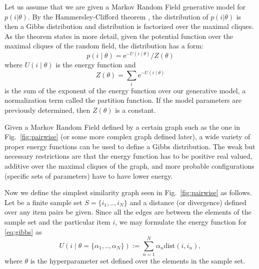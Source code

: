 Let us assume that we are given a Markov Random Field generative model for $p (i|\theta)$.
By the Hammersley-Clifford theorem \cite{hammersley1971markov}, the distribution of $p (i|\theta)$ is then a Gibbs distribution and distribution is factorized over the maximal cliques.
As the theorem states in more detail, given the potential function over the maximal cliques of the random field, the distribution has a form:
%
\begin{equation}
    p(i \mid \theta) = {\mathrm{e}^{-U(i\mid \theta)}}/{Z(\theta)}
    \label{eq:gibbs}
\end{equation}
%
where $U(i\mid \theta)$ is the energy function and 
%
\begin{equation}
Z(\theta) = \sum_{i} \mathrm{e}^{-U(i \mid \theta)}
\nonumber
\end{equation}
%
is the sum of the exponent of the energy function over our generative model, a normalization term called the partition function. If the model parameters are previously determined, then $Z(\theta)$ is a constant. 

Given a Markov Random Field defined by a certain graph such as the one in Fig.~\ref{fig:pairwise} (or some more complex graph defined later), a wide variety of proper energy functions can be used to define a Gibbs distribution. The weak but necessary restrictions are that the energy function has to be positive real valued, additive over the maximal cliques of the graph, and more probable configurations (specific sets of parameters) have to have lower energy. 

Now we define the simplest similarity graph seen in Fig.~\ref{fig:pairwise} as follows. Let be a finite sample set $S=\{i_1,..,i_{N}\}$ and a distance (or divergence) defined over any item pairs be given.  Since all the edges are between the elements of the sample set and the particular item $i$, we may formulate the energy function for \eqref{eq:gibbs} as
%
\begin{equation}
U(i \mid \theta=\{\alpha_1,..,\alpha_{N}\}) := \sum_{n=1}^{N} \alpha_n \mbox{dist}(i,i_n),
\label{eq:potential}
\end{equation}
where $\theta$ is the hyperparameter set defined over the elements in the sample set. 


